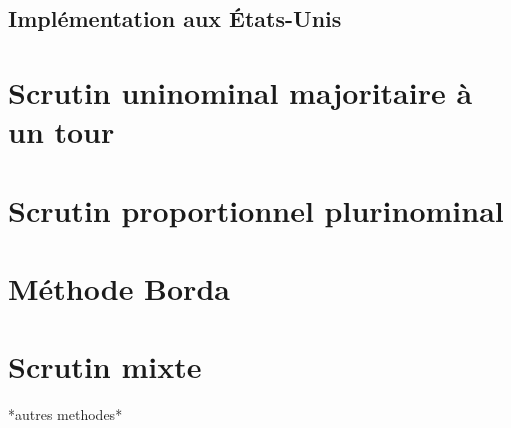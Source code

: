\documentclass[11pt,a4paper]{report}
\begin{document}
\section{Implémentation aux États-Unis}
\nocite{wiki:eleccoll}

\chapter{Scrutin uninominal majoritaire à un tour}

\chapter{Scrutin proportionnel plurinominal}

\chapter{Méthode Borda}

\chapter{Scrutin mixte}

*autres methodes*


\newpage

 

\end{document}
